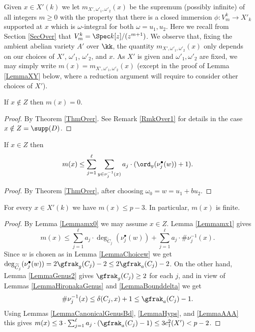 Given $x\in X'(k)$ we let $m_{X',\omega'_1,\omega'_2}(x)$ be the supremum (possibly infinite) of all integers $m\ge 0$ with the property that there is a closed immersion $\phi : V_m^k\to X'_k$ supported at $x$ which is $\omega$-integral for both $\omega=u_1,u_2$. Here we recall from Section \ref{SecOver} that $V^k_m=\Spec k[z]/(z^{m+1})$. We observe that, fixing the ambient abelian variety $A'$ over $\kk$,  the quantity $m_{X',\omega'_1,\omega'_2}(x)$ only depends on our choices of $X'$, $\omega'_1$, $\omega'_2$, and $x$. As $X'$ is given  and $\omega'_1,\omega'_2$ are fixed, we may simply write $m(x)=m_{X',\omega'_1,\omega'_2}(x)$ (except in the proof of Lemma \ref{LemmaXY} below, where a reduction argument will require to consider other choices of $X'$).

\begin{lemma}
\notready\label{Lemmamx0} If $x\notin Z$ then $m(x)=0$.
\end{lemma}
\begin{proof} By Theorem \ref{ThmOver}. See Remark \ref{RmkOver1} for details in the case $x\notin Z=\supp(D)$.
\end{proof}

\begin{lemma}
\notready\label{Lemmamx1} If $x\in Z$ then
$$
m(x)\le \sum_{j=1}^\ell \sum_{y\in \nu_j^{-1}(x)} a_j\cdot (\ord_y(\nu_j^\bullet(w))+1).
$$
\end{lemma}
\begin{proof} By Theorem \ref{ThmOver}, after choosing $\omega_0=w=u_1+bu_2$.
\end{proof}




\begin{lemma}
\notready\label{Lemmamxp} For every $x\in X'(k)$ we have $m(x)\le p-3$. In particular, $m(x)$ is finite.
\end{lemma}
\begin{proof} By Lemma \ref{Lemmamx0} we may assume $x\in Z$. Lemma \ref{Lemmamx1} gives
$$
m(x)\le \sum_{j=1}^\ell  a_j\cdot \deg_{\widetilde{C}_j}(\nu_j^\bullet(w)) + \sum_{j=1}^\ell a_j\cdot \# \nu_j^{-1}(x).
$$
Since $w$ is chosen as in Lemma \ref{LemmaChoicew} we get $\deg_{\widetilde{C}_j}(\nu_j^\bullet(w))=2\gfrak_g(C_j)-2\le 2\gfrak_a(C_j)-2$. On the other hand, Lemma \ref{LemmaGenus2} gives $\gfrak_g(C_j)\ge 2$ for each $j$, and in view of Lemmas \ref{LemmaHironakaGenus} and \ref{LemmaBounddelta} we get
$$
\#\nu^{-1}_j(x)\le \delta(C_j,x)+1\le \gfrak_a(C_j)-1.
$$
Using Lemmas \ref{LemmaCanonicalGenusBd}, \ref{LemmaHyps}, and \ref{LemmaAAA} this gives $m(x)\le 3\cdot  \sum_{j=1}^\ell a_j\cdot (\gfrak_a(C_j)-1)\le 3c_1^2(X')<p-2$.
\end{proof}



